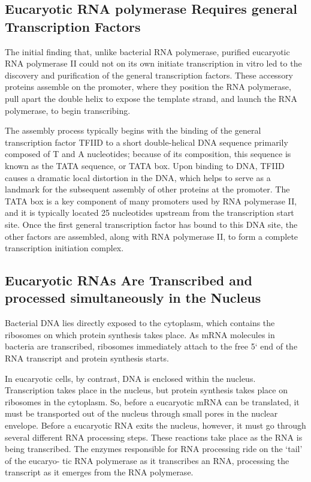 \subsection{Eucaryotic RNA polymerase Requires general Transcription Factors}

The initial finding that, unlike bacterial RNA polymerase, purified eucaryotic
RNA polymerase II could not on its own initiate transcription in vitro
led to the discovery and purification of the general transcription factors.
These accessory proteins assemble on the promoter, where they position
the RNA polymerase, pull apart the double helix to expose the template
strand, and launch the RNA polymerase, to begin transcribing.

The assembly process typically
begins with the binding of the general transcription factor TFIID to a short
double-helical DNA sequence primarily composed of T and A nucleotides;
because of its composition, this sequence is known as the TATA sequence,
or TATA box. Upon binding to DNA, TFIID causes a dramatic local distortion in the DNA,
which helps to serve as a landmark for the
subsequent assembly of other proteins at the promoter. The TATA box is
a key component of many promoters used by RNA polymerase II, and it
is typically located 25 nucleotides upstream from the transcription start
site. Once the first general transcription factor has bound to this DNA site,
the other factors are assembled, along with RNA polymerase II, to form a
complete transcription initiation complex.


\subsection{Eucaryotic RNAs Are Transcribed and processed simultaneously in the Nucleus}

Bacterial DNA lies directly exposed to the cytoplasm,
which contains the ribosomes on which protein synthesis takes place.
As mRNA molecules in bacteria are transcribed, ribosomes immediately
attach to the free 5` end of the RNA transcript and protein synthesis
starts.

In eucaryotic cells, by contrast, DNA is enclosed within the nucleus.
Transcription takes place in the nucleus, but protein synthesis takes place
on ribosomes in the cytoplasm. So, before a eucaryotic mRNA can be
translated, it must be transported out of the nucleus through small pores
in the nuclear envelope. Before a eucaryotic RNA exits the
nucleus, however, it must go through several different RNA processing
steps. These reactions take place as the RNA is being transcribed. The
enzymes responsible for RNA processing ride on the ‘tail’ of the eucaryo-
tic RNA polymerase as it transcribes an RNA, processing the transcript as
it emerges from the RNA polymerase.

